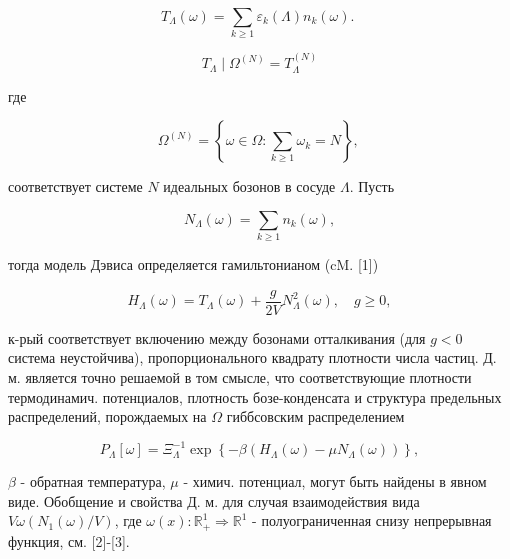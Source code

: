 \documentclass[10pt]{article}
\begin{document}
\[

T_{\Lambda}(\omega)=\sum_{k \geqslant 1} \varepsilon_{k}(\Lambda) n_{k}(\omega) \text {. }

\]



\[

T_{\Lambda} \mid \Omega^{(N)}=T_{\Lambda}^{(N)}

\]



где



\[

\Omega^{(N)}=\left\{\omega \in \Omega: \sum_{k \geqslant 1} \omega_{k}=N\right\} \text {, }

\]



соответствует системе $N$ идеальных бозонов в сосуде $\Lambda$. Пусть



\[

N_{\Lambda}(\omega)=\sum_{k \geqslant 1} n_{k}(\omega),

\]



тогда модель Дэвиса определяется гамильтонианом (cM. [1])



\[

H_{\Lambda}(\omega)=T_{\Lambda}(\omega)+\frac{g}{2 V} N_{\Lambda}^{2}(\omega), \quad g \geqslant 0,

\]



к-рый соответствует включению между бозонами отталкивания (для $g<0$ система неустойчива), пропорционального квадрату плотности числа частиц. Д. м. является точно решаемой в том смысле, что соответствующие плотности термодинамич. потенциалов, плотность бозе-конденсата и структура предельных распределений, порождаемых на $\Omega$ гиббсовским распределением



\[

P_{\Lambda}[\omega]=\Xi_{\Lambda}^{-1} \exp \left\{-\beta\left(H_{\Lambda}(\omega)-\mu N_{\Lambda}(\omega)\right)\right\},

\]



$\beta$ - обратная температура, $\mu$ - химич. потенциал, могут быть найдены в явном виде. Обобщение и свойства Д. м. для случая взаимодействия вида $V \omega\left(N_{1}(\omega) / V\right)$, где $\omega(x): \mathbb{R}_{+}^{1} \Rightarrow \mathbb{R}^{1}$ - полуограниченная снизу непрерывная функция, см. [2]-[3].
\end{document}
